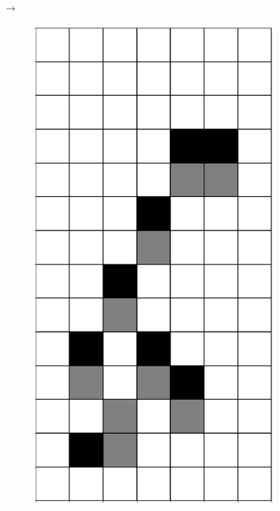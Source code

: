 \documentclass[12pt]{article}
\numberwithin{figure}{section} %
\begin{document}
\begin{figure}[H]
\begin{subfigure}{0.3\textwidth}
     \subcaption{}
   \end{subfigure}
      {\LARGE$\xrightarrow{}$}
      \newline
   \setcounter{subfigure}{0}
      \begin{subfigure}{0.3\textwidth}
     \centering
     \includegraphics[angle=270,width=\linewidth]{Section4/12.0}

\end{subfigure}
\end{figure}
\end{document}
